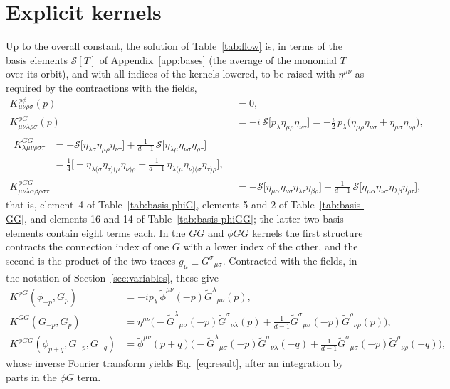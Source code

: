 \documentclass[prd,aps,preprint,superscriptaddress,nofootinbib,amsmath,amssymb,eqsecnum]{revtex4-2}
\newcommand{\p}{\tilde{\phi}}
\newcommand{\G}{\tilde{G}}
\begin{document}
\section{Explicit kernels}
\label{app:kernels}

Up to the overall constant, the solution of Table~\ref{tab:flow} is, in terms of the basis
elements $\mathcal{S}[T]$ of Appendix~\ref{app:bases} (the average of the monomial $T$ over
its orbit), and with all indices of the kernels lowered, to be raised with $\eta^{\mu\nu}$
as required by the contractions with the fields,
\begin{align}
K^{\phi\phi}_{\mu\nu\rho\sigma}(p)&=0,\\
K^{\phi G}_{\mu\nu\lambda\rho\sigma}(p)&=-i\,\mathcal{S}\big[p_\lambda\eta_{\mu\rho}\eta_{\nu\sigma}\big]
=-\tfrac{i}{2}\,p_\lambda\big(\eta_{\mu\rho}\eta_{\nu\sigma}+\eta_{\mu\sigma}\eta_{\nu\rho}\big),\\
\begin{split}
K^{GG}_{\lambda\mu\nu\rho\sigma\tau}&=
-\mathcal{S}\big[\eta_{\lambda\sigma}\eta_{\mu\rho}\eta_{\nu\tau}\big]
+\frac{1}{d-1}\,\mathcal{S}\big[\eta_{\lambda\mu}\eta_{\nu\sigma}\eta_{\rho\tau}\big]\\
&=\tfrac14\Big[-\eta_{\lambda(\sigma}\eta_{\tau)(\mu}\eta_{\nu)\rho}
+\frac{1}{d-1}\,\eta_{\lambda(\mu}\eta_{\nu)(\sigma}\eta_{\tau)\rho}\Big],
\end{split}\\
K^{\phi GG}_{\mu\nu\lambda\alpha\beta\rho\sigma\tau}&=
-\mathcal{S}\big[\eta_{\mu\alpha}\eta_{\nu\sigma}\eta_{\lambda\tau}\eta_{\beta\rho}\big]
+\frac{1}{d-1}\,\mathcal{S}\big[\eta_{\mu\alpha}\eta_{\nu\sigma}\eta_{\lambda\beta}\eta_{\rho\tau}\big],
\end{align}
that is, element~4 of Table~\ref{tab:basis-phiG}, elements 5 and 2 of
Table~\ref{tab:basis-GG}, and elements 16 and 14 of Table~\ref{tab:basis-phiGG}; the latter
two basis elements contain eight terms each. In the $GG$ and $\phi GG$ kernels the first
structure contracts the connection index of one $G$ with a lower index of the other, and the
second is the product of the two traces $g_\mu\equiv G^{\sigma}{}_{\mu\sigma}$.
Contracted with the fields, in the notation of Section~\ref{sec:variables}, these give
\begin{align}
K^{\phi G}(\phi_{-p},G_p)&=-ip_\lambda\,\p^{\mu\nu}(-p)\G^{\lambda}{}_{\mu\nu}(p),\\
K^{GG}(G_{-p},G_p)&=
\eta^{\mu\nu}\Big(-\G^{\lambda}{}_{\mu\sigma}(-p)\G^{\sigma}{}_{\nu\lambda}(p)+\frac{1}{d-1}\G^{\sigma}{}_{\mu\sigma}(-p)\G^{\rho}{}_{\nu\rho}(p)\Big),\\
K^{\phi GG}(\phi_{p+q},G_{-p},G_{-q})&=
\p^{\mu\nu}(p+q)\Big(-\G^{\lambda}{}_{\mu\sigma}(-p)\G^{\sigma}{}_{\nu\lambda}(-q)+\frac{1}{d-1}\G^{\sigma}{}_{\mu\sigma}(-p)\G^{\rho}{}_{\nu\rho}(-q)\Big),
\end{align}
whose inverse Fourier transform yields Eq.~\eqref{eq:result}, after an integration by parts
in the $\phi G$ term.
\end{document}

